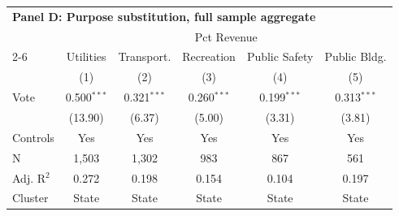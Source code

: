 \begingroup
\small
\centering
\begin{tabular*}{\textwidth}{@{\extracolsep{\fill}}lccccc}
\multicolumn{6}{l}{\textbf{Panel D: Purpose substitution, full sample aggregate}}\\

\addlinespace
   \toprule
     & \multicolumn{5}{c}{Pct Revenue} \\ 
   \cmidrule(lr){2-6}
                  & Utilities     & Transport.    & Recreation    & Public Safety & Public Bldg. \\   
                  & (1)           & (2)           & (3)           & (4)           & (5)\\  
   \midrule 
   Vote           & 0.500$^{***}$ & 0.321$^{***}$ & 0.260$^{***}$ & 0.199$^{***}$ & 0.313$^{***}$\\   
                  & (13.90)      & (6.37)       & (5.00)       & (3.31)       & (3.81)\\   
   \hline
   Controls       & Yes & Yes & Yes & Yes & Yes\\
   N   & 1,503         & 1,302         & 983           & 867           & 561\\  
   Adj. R$^2$ & 0.272         & 0.198         & 0.154         & 0.104         & 0.197\\  
   Cluster              & State & State & State & State & State\\  
   \bottomrule
\end{tabular*}
\par\endgroup
